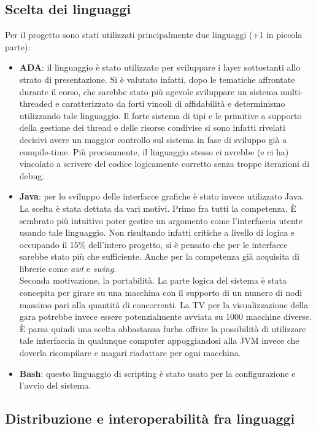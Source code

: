 \subsection{Scelta dei linguaggi}
Per il progetto sono stati utilizzati principalmente due linguaggi (+1 in piccola parte):
\begin{itemize}
\item \textbf{ADA}: il linguaggio \`{e} stato utilizzato per sviluppare i layer sottostanti allo strato di presentazione. Si \`{e} valutato infatti,
dopo le tematiche affrontate durante il corso, che sarebbe stato pi\`{u} agevole sviluppare un sistema multi-threaded e caratterizzato
da forti vincoli di affidabilit\`{a} e determinismo utilizzando tale linguaggio. Il forte sistema di tipi e le primitive a supporto della gestione
dei thread e delle risorse condivise si sono infatti rivelati decisivi avere un maggior controllo sul sistema in fase di sviluppo gi\`{a} 
a compile-time. Pi\`{u} precisamente, il linguaggio stesso ci avrebbe (e ci ha) vincolato a scrivere del codice logicamente corretto senza
troppe iterazioni di debug.
\item \textbf{Java}: per lo sviluppo delle interfacce grafiche \`{e} stato invece utilizzato Java. La scelta \`{e} stata dettata da vari motivi.
Primo fra tutti la competenza. \`{E} sembrato pi\`{u} intuitivo poter gestire un argomento come l'interfaccia utente usando tale linguaggio.
Non risultando infatti critiche a livello di logica e occupando il 15\% dell'intero progetto, si \`{e} pensato che per le interfacce sarebbe
stato pi\`{u} che sufficiente. Anche per la competenza gi\`{a} acquisita di librerie come \emph{awt} e \emph{swing}.\\
Seconda motivazione, la portabilit\`{a}. La parte logica del sistema \`{e} stata concepita per girare su una macchina con il supporto di un numero di
nodi massimo pari alla quantit\`{a} di concorrenti. La TV per la visualizzazione della gara potrebbe invece essere potenzialmente avviata
su 1000 macchine diverse. \`{E} parsa quindi una scelta abbastanza furba offrire la possibilit\`{a} di utilizzare tale interfaccia in qualunque
computer appoggiandosi alla JVM invece che doverla ricompilare e magari riadattare per ogni macchina.
\item \textbf{Bash}: questo linguaggio di scripting \`{e} stato usato per la configurazione e l'avvio del sistema.
\end{itemize}
\subsection{Distribuzione e interoperabilit\`{a} fra linguaggi}

